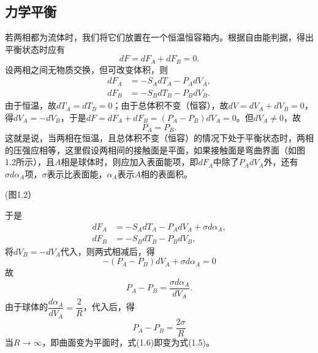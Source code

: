 ﻿\subsection{力学平衡}
若两相都为流体时，我们将它们放置在一个恒温恒容箱内。根据自由能判据，得出平衡状态时应有
$$dF=dF_A+dF_B=0.$$
设两相之间无物质交换，但可改变体积，则
\begin{equation}
\begin{aligned}
dF_A&=-S_AdT_A-P_AdV_A, \\
dF_B&=-S_BdT_B-P_BdV_B.
\end{aligned}
\end{equation}
由于恒温，故$dT_A=dT_B=0$；由于总体积不变（恒容），故$dV=dV_A+dV_B=0$，得$dV_A=-dV_B$，于是$dF=dF_A+dF_B=\left(P_A-P_B\right)dV_A=0$。但$dV_A\neq 0$，故
\begin{equation}
P_A=P_B.
\end{equation}
这就是说，当两相在恒温，且总体积不变（恒容）的情况下处于平衡状态时，两相的压强应相等，这里假设两相间的接触面是平面，如果接触面是弯曲界面（如图1.2所示），且$A$相是球体时，则应加入表面能项，即$dF_A$中除了$P_AdV_A$外，还有$\sigma d\alpha_A$项，$\sigma$表示比表面能，$\alpha_A$表示$A$相的表面积。

(图1.2）

\noindent 于是
\begin{align*}
dF_A&=-S_AdT_A-P_AdV_A+\sigma d\alpha_A,\\
dF_B&=-S_BdT_B-P_BdV_B,
\end{align*}
将$dV_B=-dV_A$代入，则两式相减后，得
$$-(P_A-P_B)dV_A+\sigma d\alpha_A=0$$
故
$$P_A-P_B=\frac{\sigma d\alpha_A}{dV_A}.$$
由于球体的$\dfrac{d\alpha_A}{dV_A}=\dfrac{2}{R}$，代入后，得
\begin{equation}
P_A-P_B=\frac{2\sigma}{R}
\end{equation}
当$R\rightarrow\infty$，即曲面变为平面时，式(1.6)即变为式(1.5)。